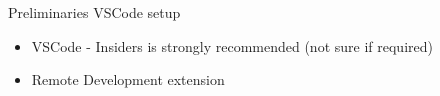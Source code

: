 \documentclass[pdf,xcolor=dvipsnames,noparindent]{beamer}
\begin{document}
\begin{frame}{Preliminaries}
  VSCode setup
  \pause
  \begin{itemize}
  \item VSCode - Insiders is strongly recommended (not sure if required)
    \pause
  \item Remote Development extension
  \end{itemize}
\end{frame}
\end{document}
